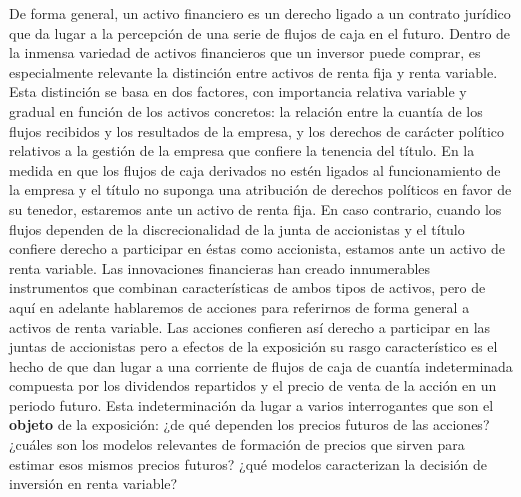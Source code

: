 \documentclass{nuevotema}
\begin{document}
\ideaclave

De forma general, un activo financiero es un derecho ligado a un contrato jurídico que da lugar a la percepción de una serie de flujos de caja en el futuro. Dentro de la inmensa variedad de activos financieros que un inversor puede comprar, es especialmente relevante la distinción entre activos de renta fija y renta variable. Esta distinción se basa en dos factores, con importancia relativa variable y gradual en función de los activos concretos: la relación entre la cuantía de los flujos recibidos y los resultados de la empresa, y los derechos de carácter político relativos a la gestión de la empresa que confiere la tenencia del título. En la medida en que los flujos de caja derivados no estén ligados al funcionamiento de la empresa y el título no suponga una atribución de derechos políticos en favor de su tenedor, estaremos ante un activo de renta fija. En caso contrario, cuando los flujos dependen de la discrecionalidad de la junta de accionistas y el título confiere derecho a participar en éstas como accionista, estamos ante un activo de renta variable. Las innovaciones financieras han creado innumerables instrumentos que combinan características de ambos tipos de activos, pero de aquí en adelante hablaremos de acciones para referirnos de forma general a activos de renta variable. Las acciones confieren así derecho a participar en las juntas de accionistas pero a efectos de la exposición su rasgo característico es el hecho de que dan lugar a una corriente de flujos de caja de cuantía indeterminada compuesta por los dividendos repartidos y el precio de venta de la acción en un periodo futuro. Esta indeterminación da lugar a varios interrogantes que son el \textbf{objeto} de la exposición: ¿de qué dependen los precios futuros de las acciones? ¿cuáles son los modelos relevantes de formación de precios que sirven para estimar esos mismos precios futuros? ¿qué modelos caracterizan la decisión de inversión en renta variable?
\end{document}
